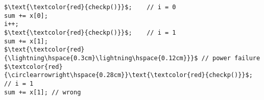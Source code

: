 \documentclass[border={20pt 5pt 10pt 10pt}]{standalone} %
\begin{document}
 \begin{lstlisting}[style=mystyle, linewidth=115px]
$\text{\textcolor{red}{checkp()}}$;    // i = 0
sum += x[0];
i++;
$\text{\textcolor{red}{checkp()}}$;    // i = 1
sum += x[1];
$\text{\textcolor{red}{\lightning\hspace{0.3cm}\lightning\hspace{0.12cm}}}$ // power failure
$\textcolor{red}{\circlearrowright\hspace{0.28cm}}\text{\textcolor{red}{checkp()}}$; // i = 1
sum += x[1]; // wrong
\end{lstlisting}
\end{document}
